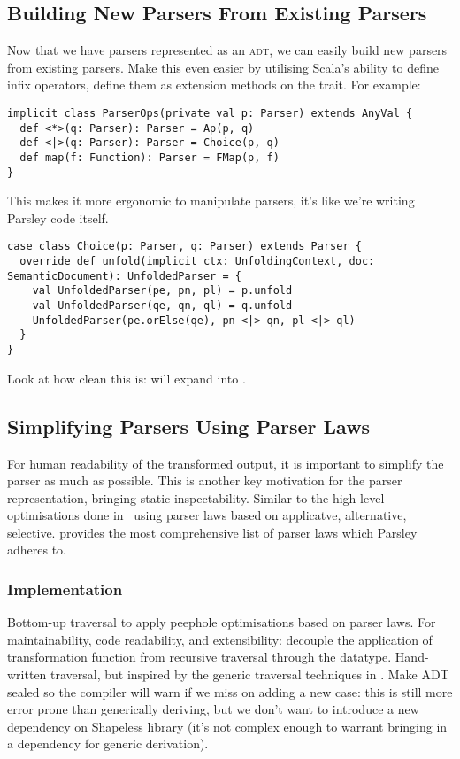 \documentclass[../../main.tex]{subfiles}
\begin{document}
\subsection{Building New Parsers From Existing Parsers}
Now that we have parsers represented as an \textsc{adt}, we can easily build new parsers from existing parsers.
Make this even easier by utilising Scala's ability to define infix operators, define them as extension methods on the  trait.
For example:
\begin{verbatim}
implicit class ParserOps(private val p: Parser) extends AnyVal {
  def <*>(q: Parser): Parser = Ap(p, q)
  def <|>(q: Parser): Parser = Choice(p, q)
  def map(f: Function): Parser = FMap(p, f)
}
\end{verbatim}
%
This makes it more ergonomic to manipulate parsers, it's like we're writing Parsley code itself.
\begin{verbatim}
case class Choice(p: Parser, q: Parser) extends Parser {
  override def unfold(implicit ctx: UnfoldingContext, doc: SemanticDocument): UnfoldedParser = {
    val UnfoldedParser(pe, pn, pl) = p.unfold
    val UnfoldedParser(qe, qn, ql) = q.unfold
    UnfoldedParser(pe.orElse(qe), pn <|> qn, pl <|> ql)
  }
}
\end{verbatim}
Look at how clean this is:  will expand into .

\subsection{Simplifying Parsers Using Parser Laws}
For human readability of the transformed output, it is important to simplify the parser as much as possible.
This is another key motivation for the parser representation, bringing static inspectability.
Similar to the high-level optimisations done in~\cite{willis_staged_2023} using parser laws based on applicatve, alternative, selective.
\textcite{willis_parsley_2023} provides the most comprehensive list of parser laws which Parsley adheres to.


\subsubsection{Implementation}
Bottom-up traversal to apply peephole optimisations based on parser laws.
For maintainability, code readability, and extensibility: decouple the application of transformation function from recursive traversal through the datatype.
Hand-written traversal, but inspired by the generic traversal techniques in \cite{mitchell_uniform_2007}.
Make ADT sealed so the compiler will warn if we miss on adding a new case: this is still more error prone than generically deriving, but we don't want to introduce a new dependency on Shapeless library (it's not complex enough to warrant bringing in a dependency for generic derivation).
\end{document}
